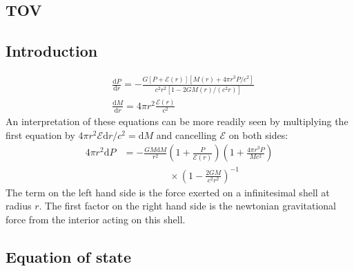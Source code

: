 \documentclass[twocolumn]{article}
\begin{document}
\begin{large}

\section*{TOV}
\subsection*{Introduction}
\begin{equation}
    \begin{split}
        &\frac{\text{d}P}{\text{d}r} = -\frac{G\left[P+\mathcal{E}(r)\right]\left[M(r)+4\pi r^3P/c^2\right]}{c^2r^2[1-2GM(r)/(c^2r)]} \\ 
        &\frac{\text{d}M}{\text{d}r} = 4\pi r^2\frac{\mathcal{E}(r)}{c^2}
    \end{split}
\end{equation}
An interpretation of these equations can be more readily seen by multiplying the first equation by $4\pi r^2\mathcal{E}\text{d}r/c^2 = \text{d}M$ and cancelling $\mathcal{E}$ on both sides:
\begin{equation}
    \begin{split}
        4\pi r^2\text{d}P &= -\frac{GM\text{d}M}{r^2}\left(1+\frac{P}{\mathcal{E}(r)}\right)\left(1+\frac{4\pi r^3P}{Mc^2}\right) \\ 
        &\hspace{2cm}\times\left(1-\frac{2GM}{c^2r^2}\right)^{-1}
    \end{split}
\end{equation}
The term on the left hand side is the force exerted on a infinitesimal shell at radius $r$. The first factor on the right hand side is the newtonian gravitational force from the interior acting on this shell.

\subsection*{Equation of state}

\end{large}
\end{document}
